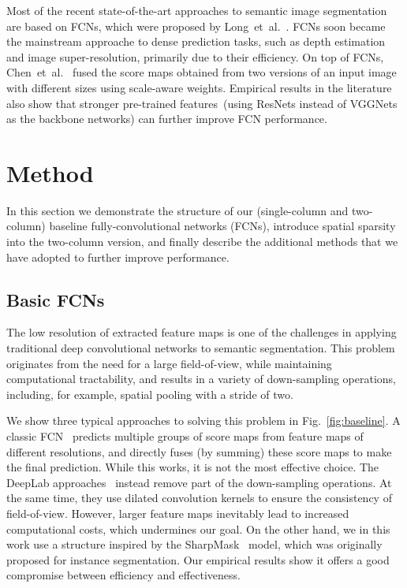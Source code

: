 \documentclass[10pt,twocolumn,letterpaper]{article}
\begin{document}
Most of the recent state-of-the-art approaches to semantic image segmentation are based on FCNs,
which were proposed by Long~et~al.~\cite{FCN.CVPR.2015.Long}.
FCNs soon became the mainstream approache to dense prediction tasks,
such as depth estimation and image super-resolution, primarily due to their efficiency.
On top of FCNs, Chen~et~al.~\cite{Attention2Scale.2015.Chen} fused the score maps obtained from two versions of an input image with different sizes using scale-aware weights.
Empirical results in the literature~\cite{DeepLab2.2016.Chen} also show that stronger pre-trained features~(using ResNets instead of VGGNets as the backbone networks) can further improve FCN performance.



%
\section{Method}
In this section we demonstrate the structure of our (single-column and two-column) baseline fully-convolutional networks (FCNs),
introduce spatial sparsity into the two-column version,
and finally describe the additional methods that we have adopted to further improve performance.


\subsection{Basic FCNs}
The low resolution of extracted feature maps is one of the challenges in applying traditional deep convolutional networks to semantic segmentation.
This problem originates from the need for a large field-of-view, while maintaining computational tractability, and results in a variety of down-sampling operations, including, for example, spatial pooling with a stride of two.

We show three typical approaches to solving this problem in Fig.~\ref{fig:baseline}.
A classic FCN~\cite{FCN.CVPR.2015.Long} predicts multiple groups of score maps from feature maps of different resolutions,
and directly fuses (by summing) these score maps to make the final prediction.
While this works, it is not the most effective choice.
The DeepLab approaches~\cite{DeepLab.ICLR.2015.Chen,DeepLab2.2016.Chen} instead remove part of the down-sampling operations.
At the same time, they use dilated convolution kernels to ensure the consistency of field-of-view.
However, larger feature maps inevitably lead to increased computational costs,
which undermines our goal.
On the other hand, we in this work use a structure inspired by the SharpMask~\cite{SharpMask.2016.Pinheiro} model, which was originally proposed for instance segmentation.
Our empirical results show it offers a good compromise between efficiency and effectiveness.
\end{document}
